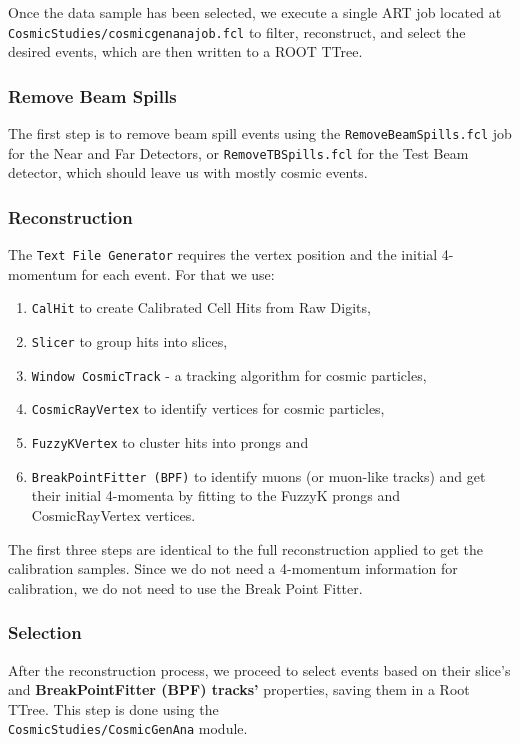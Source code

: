 \documentclass[12pt]{article}
\begin{document}
Once the data sample has been selected, we execute a single ART job located at \newline \texttt{CosmicStudies/cosmicgenanajob.fcl} to filter, reconstruct, and select the desired events, which are then written to a ROOT TTree.

\subsubsection{Remove Beam Spills}
The first step is to remove beam spill events using the \texttt{RemoveBeamSpills.fcl} job for the Near and Far Detectors, or \texttt{RemoveTBSpills.fcl} for the Test Beam detector, which should leave us with mostly cosmic events.

\subsubsection{Reconstruction}
The \texttt{Text File Generator} requires the vertex position and the initial 4-momentum for each event. For that we use:
\begin{enumerate}
\item \texttt{CalHit} to create Calibrated Cell Hits from Raw Digits,
\item \texttt{Slicer} to group hits into slices,
\item \texttt{Window CosmicTrack} - a tracking algorithm for cosmic particles,
\item \texttt{CosmicRayVertex} to identify vertices for cosmic particles,
\item \texttt{FuzzyKVertex} to cluster hits into prongs and
\item \texttt{BreakPointFitter (BPF)} to identify muons (or muon-like tracks) and get their initial 4-momenta by fitting to the FuzzyK prongs and CosmicRayVertex vertices.
\end{enumerate}
The first three steps are identical to the full reconstruction applied to get the calibration samples. Since we do not need a 4-momentum information for calibration, we do not need to use the Break Point Fitter.

\subsubsection{Selection}
After the reconstruction process, we proceed to select events based on their slice's and \textbf{BreakPointFitter (BPF) tracks'} properties, saving them in a Root TTree. This step is done using the\\ \texttt{CosmicStudies/CosmicGenAna} module.
\end{document}
